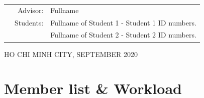 \documentclass[a4paper]{article}
\begin{document}
\begin{titlepage}
        \begin{table}[h]
            \begin{tabular}{rrl}
                \hspace{5 cm} & Advisor:  & Fullname                                      \\
                & Students: & Fullname of Student 1 - Student 1 ID numbers. \\
                &           & Fullname of Student 2 - Student 2 ID numbers. \\
            \end{tabular}
        \end{table}

        \begin{center}
        {\footnotesize HO CHI MINH CITY, SEPTEMBER 2020}
        \end{center}
    \end{titlepage}



    \newpage
    \tableofcontents
    \newpage




    \section{Member list \& Workload}
\end{document}
